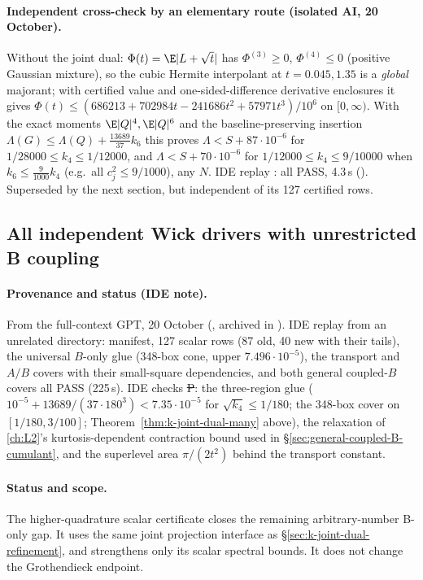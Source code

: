 \paragraph{Independent cross-check by an elementary route (isolated AI, 20 October).} Without the joint dual: $\Phi(t)=\E|L+\sqrt t|$ has $\Phi^{(3)}\ge0$,
$\Phi^{(4)}\le0$ (positive Gaussian mixture), so the cubic Hermite interpolant at $t=0.045,1.35$ is a \emph{global} majorant; with certified value and one-sided-difference
derivative enclosures it gives $\Phi(t)\le(686213+702984t-241686t^2+57971t^3)/10^6$ on $[0,\infty)$. With the exact moments $\E|Q|^4,\E|Q|^6$ and the
baseline-preserving insertion $\Lambda(G)\le\Lambda(Q)+\frac{13689}{37}k_6$ this proves $\Lambda<S+87\cdot10^{-6}$ for $1/28000\le k_4\le1/12000$, and
$\Lambda<S+70\cdot10^{-6}$ for $1/12000\le k_4\le9/10000$ when $k_6\le\frac9{1000}k_4$ (e.g.\ all $c_j^2\le9/1000$), any $N$. IDE replay : all
PASS, 4.3\,s (). Superseded by the next section, but independent of its 127 certified rows.

\subsection{All independent Wick drivers with unrestricted B coupling}
\label{sec:k-bonly-all}
\paragraph{Provenance and status (IDE note).} From the full-context GPT, 20 October (, archived in
). IDE replay  from an unrelated directory: manifest, 127 scalar rows (87 old, 40 new with their tails), the universal $B$-only glue (348-box cone, upper $7.496\cdot10^{-5}$), the transport and $A/B$ covers with their small-square dependencies, and both general coupled-$B$ covers all PASS (225\,s). IDE checks \st{P}: the three-region glue
($10^{-5}+13689/(37\cdot180^3)<7.35\cdot10^{-5}$ for $\sqrt{k_4}\le1/180$; the 348-box cover on $[1/180,3/100]$; Theorem~\ref{thm:k-joint-dual-many} above), the relaxation
of \autoref{ch:L2}'s kurtosis-dependent contraction bound used in \S\ref{sec:general-coupled-B-cumulant}, and the superlevel area $\pi/(2t^2)$ behind the transport constant.

\paragraph{Status and scope.}
The higher-quadrature scalar certificate closes the remaining arbitrary-number
B-only gap. It uses the same joint projection interface as
\S\ref{sec:k-joint-dual-refinement}, and strengthens only its scalar spectral
bounds. It does not change the Grothendieck endpoint.

